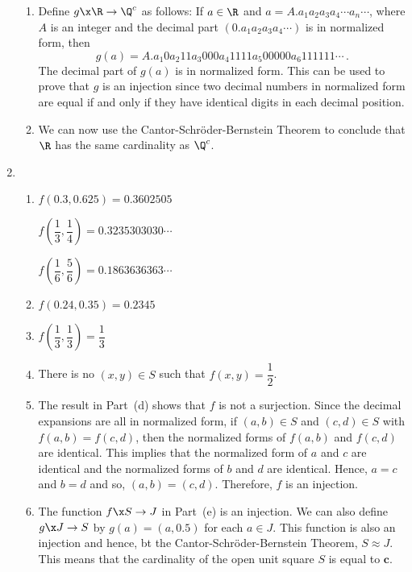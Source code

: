 \begin{enumerate}
\begin{enumerate}
\item Define $g\x \R \to \Q^c$ as follows:  If $a \in \R$ and $a = A.a_1 a_2 a_3 a_4 \cdots a_n \cdots$, where $A$ is an integer and the decimal part $( 0.a_1 a_2 a_3 a_4 \cdots )$ is in normalized form, then 
\[
g(a) = A.a_1 0 a_2 1 1 a_3 0 0 0 a_4 1 1 1 1 a_5 0 0 0 0 0 a_6 1 1 1 1 1 1 \cdots \,.
\]
The decimal part of $g(a)$ is in normalized form.  This can be used to prove that $g$ is an injection since two decimal numbers in normalized form are equal if and only if they have identical digits in each decimal position.

\item We can now use the Cantor-Schr\"{o}der-Bernstein Theorem to conclude that $\R$ has the same cardinality as $\Q^c$.
\end{enumerate}



\item \begin{enumerate}
\item \begin{multicols}{2}
$f ( 0.3, 0.625 ) = 0.3602505$ 

$f \!\left( \dfrac{1}{3}, \dfrac{1}{4} \right) = 0.3235303030 \cdots$

$f \!\left( \dfrac{1}{6}, \dfrac{5}{6} \right) = 0.1863636363 \cdots$
\end{multicols}

\item $f(0.24, 0.35) = 0.2345$

\item $f \!\left( \dfrac{1}{3}, \dfrac{1}{3} \right) = \dfrac{1}{3}$

\item There is no $(x, y) \in S$ such that $f(x, y) = \dfrac{1}{2}$.

\item The result in Part~(d) shows that $f$ is not a surjection.  Since the decimal expansions are all in normalized form, if $(a, b) \in S$ and $(c, d) \in S$ with $f(a, b) = f(c, d)$, then the normalized forms of $f(a, b)$ and $f(c, d)$ are identical.  This implies that the normalized form of $a$ and $c$ are identical and the normalized forms of $b$ and $d$ are identical.  Hence, 
$a = c$ and $b = d$ and so, $(a, b) = (c, d)$.  Therefore, $f$ is an injection.

\item The function $f\x S \to J$ in Part~(e) is an injection.  We can also define 
$g\x J \to S$ by $g(a) = (a, 0.5)$ for each $a \in J$.  This function is also an injection and hence, bt the Cantor-Schr\"{o}der-Bernstein Theorem, \linebreak
$S \approx J$.  This means that the cardinality of the open unit square $S$ is equal to $\boldsymbol{c}$.
\end{enumerate}
\end{enumerate}
\hbreak
\endinput
